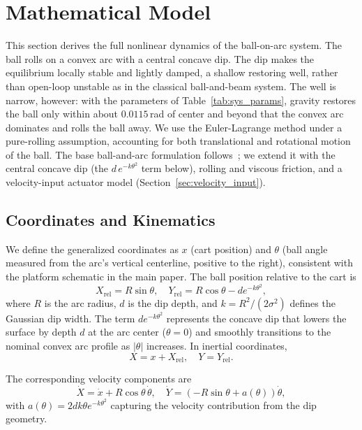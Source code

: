 \section{Mathematical Model}
\label{appendix:dynamics}
This section derives the full nonlinear dynamics of the ball-on-arc system. The ball rolls on a convex arc with a central concave dip. The dip makes the equilibrium locally stable and lightly damped, a shallow restoring well, rather than open-loop unstable as in the classical ball-and-beam system. The well is narrow, however: with the parameters of Table~\ref{tab:sys_params}, gravity restores the ball only within about $0.0115$\,rad of center and beyond that the convex arc dominates and rolls the ball away. We use the Euler-Lagrange method under a pure-rolling assumption, accounting for both translational and rotational motion of the ball. The base ball-and-arc formulation follows~\cite{ho2010smc}; we extend it with the central concave dip (the $d\,e^{-k\theta^2}$ term below), rolling and viscous friction, and a velocity-input actuator model (Section~\ref{sec:velocity_input}).

\subsection{Coordinates and Kinematics}

We define the generalized coordinates as $x$ (cart position) and $\theta$ (ball angle measured from the arc's vertical centerline, positive to the right), consistent with the platform schematic in the main paper. The ball position relative to the cart is
\begin{equation}
X_{\mathrm{rel}} = R \sin\theta, \quad
Y_{\mathrm{rel}} = R \cos\theta - d e^{-k\theta^2},
\end{equation}
where $R$ is the arc radius, $d$ is the dip depth, and $k = R^2/(2\sigma^2)$ defines the Gaussian dip width. The term $d e^{-k\theta^2}$ represents the concave dip that lowers the surface by depth $d$ at the arc center ($\theta = 0$) and smoothly transitions to the nominal convex arc profile as $|\theta|$ increases. In inertial coordinates,
\begin{equation}
X = x + X_{\mathrm{rel}}, \quad Y = Y_{\mathrm{rel}}.
\end{equation}

The corresponding velocity components are
\begin{equation}
\label{eq:XYcoordVel}
\dot X = \dot x + R \cos\theta \, \dot\theta, \quad
\dot Y = (-R \sin\theta + a(\theta)) \dot\theta,
\end{equation}
with $a(\theta) = 2 d k \theta e^{-k\theta^2}$ capturing the velocity contribution from the dip geometry.

